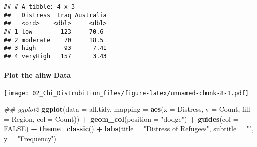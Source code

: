 \documentclass[
]{article}
\newenvironment{Shaded}{\begin{snugshade}}{\end{snugshade}}
\newcommand{\CommentTok}[1]{\textcolor[rgb]{0.56,0.35,0.01}{\textit{#1}}}
\newcommand{\DataTypeTok}[1]{\textcolor[rgb]{0.13,0.29,0.53}{#1}}
\newcommand{\KeywordTok}[1]{\textcolor[rgb]{0.13,0.29,0.53}{\textbf{#1}}}
\newcommand{\NormalTok}[1]{#1}
\newcommand{\OperatorTok}[1]{\textcolor[rgb]{0.81,0.36,0.00}{\textbf{#1}}}
\newcommand{\OtherTok}[1]{\textcolor[rgb]{0.56,0.35,0.01}{#1}}
\newcommand{\StringTok}[1]{\textcolor[rgb]{0.31,0.60,0.02}{#1}}
\begin{document}
\begin{verbatim}
## # A tibble: 4 x 3
##   Distress  Iraq Australia
##   <ord>    <dbl>     <dbl>
## 1 low        123     70.6 
## 2 moderate    70     18.5 
## 3 high        93      7.41
## 4 veryHigh   157      3.43
\end{verbatim}

\hypertarget{plot-the-aihw-data}{%
\paragraph{Plot the aihw Data}\label{plot-the-aihw-data}}

\begin{Shaded}
\end{Shaded}

\texttt{[image: 02\_Chi\_Distrubition\_files/figure-latex/unnamed-chunk-8-1.pdf]}

\begin{Shaded}
\begin{Highlighting}[]
\CommentTok{\#\# ggplot2}
\KeywordTok{ggplot}\NormalTok{(}\DataTypeTok{data =}\NormalTok{ all.tidy, }\DataTypeTok{mapping =} \KeywordTok{aes}\NormalTok{(}\DataTypeTok{x =}\NormalTok{ Distress, }\DataTypeTok{y =}\NormalTok{ Count, }\DataTypeTok{fill =}\NormalTok{ Region, }\DataTypeTok{col =}\NormalTok{ Count)) }\OperatorTok{+}
\StringTok{  }\KeywordTok{geom\_col}\NormalTok{(}\DataTypeTok{position =} \StringTok{"dodge"}\NormalTok{) }\OperatorTok{+}
\StringTok{  }\KeywordTok{guides}\NormalTok{(}\DataTypeTok{col =} \OtherTok{FALSE}\NormalTok{) }\OperatorTok{+}
\StringTok{  }\KeywordTok{theme\_classic}\NormalTok{() }\OperatorTok{+}
\StringTok{  }\KeywordTok{labs}\NormalTok{(}\DataTypeTok{title =} \StringTok{"Distress of Refugees"}\NormalTok{, }\DataTypeTok{subtitle =} \StringTok{""}\NormalTok{, }\DataTypeTok{y =} \StringTok{"Frequency"}\NormalTok{)}
\end{Highlighting}
\end{Shaded}
\end{document}

